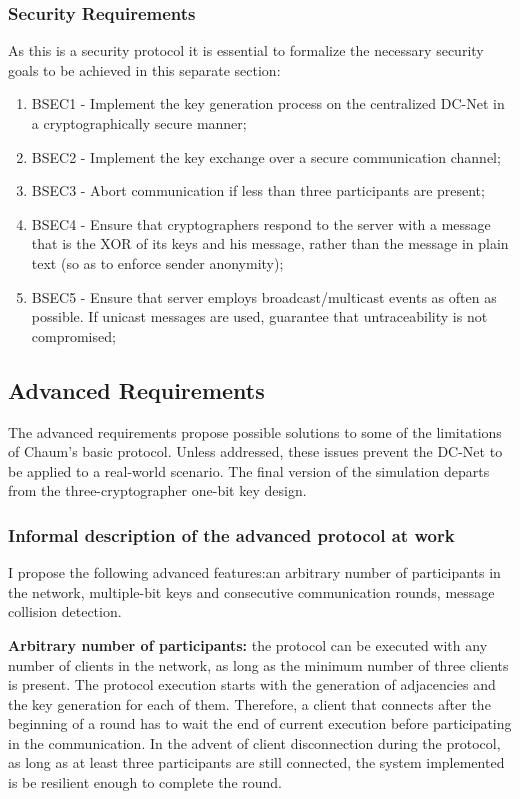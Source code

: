 \subsubsection{Security Requirements}
As this is a security protocol it is essential to formalize the necessary security goals to be achieved in this separate section:
\begin{enumerate}
    \item BSEC1 - Implement the key generation process on the centralized DC-Net in a cryptographically secure manner;
    \item BSEC2 - Implement the key exchange over a secure communication channel;
    \item BSEC3 - Abort communication if less than three participants are present;
    \item BSEC4 - Ensure that cryptographers respond to the server with a message that is the XOR of its keys and his message, rather than the message in plain text (so as to enforce sender anonymity);
    \item BSEC5 - Ensure that server employs broadcast/multicast events as often as possible. If unicast messages are used, guarantee that untraceability is not compromised;
\end{enumerate}

\subsection{Advanced Requirements} \label{sec:advancedReq}
The advanced requirements propose possible solutions to some of the limitations of Chaum's basic protocol. Unless addressed, these issues prevent the DC-Net to be applied to a real-world scenario. The final version of the simulation departs from the three-cryptographer one-bit key design. \newline

\subsubsection{Informal description of the advanced protocol at work}
I propose the following advanced features:an arbitrary number of participants in the network, multiple-bit keys and consecutive communication rounds, message collision detection.

\textbf{Arbitrary number of participants:} the protocol can be executed with any number of clients in the network, as long as the minimum number of three clients is present. The protocol execution starts with the generation of adjacencies and the key generation for each of them. Therefore, a client that connects after the beginning of a round has to wait the end of current execution before participating in the communication. In the advent of client disconnection during the protocol, as long as at least three participants are still connected, the system implemented is be resilient enough to complete the round. \newline

